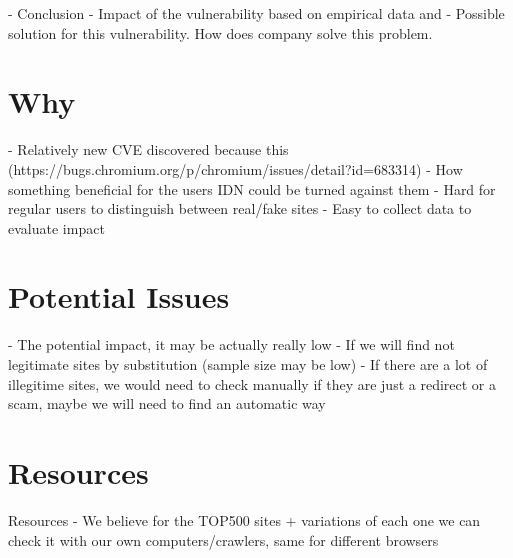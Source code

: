 \documentclass[letterpaper,twocolumn,10pt]{article}
\begin{document}
- Conclusion
  - Impact of the vulnerability based on empirical data and %
  - Possible solution for this vulnerability. How does company solve this problem.

\section{Why}
- Relatively new CVE discovered because this (https://bugs.chromium.org/p/chromium/issues/detail?id=683314)
- How something beneficial for the users IDN could be turned against them
- Hard for regular users to distinguish between real/fake sites
- Easy to collect data to evaluate impact

\section{Potential Issues}
- The potential impact, it may be actually really low
- If we will find not legitimate sites by substitution (sample size may be low)
- If there are a lot of illegitime sites, we would need to check manually if they are just a redirect or a scam, maybe we will need to find an automatic way



\section{Resources}
Resources
- We believe for the TOP500 sites + variations of each one we can check it with our own computers/crawlers, same for different browsers
\end{document}
